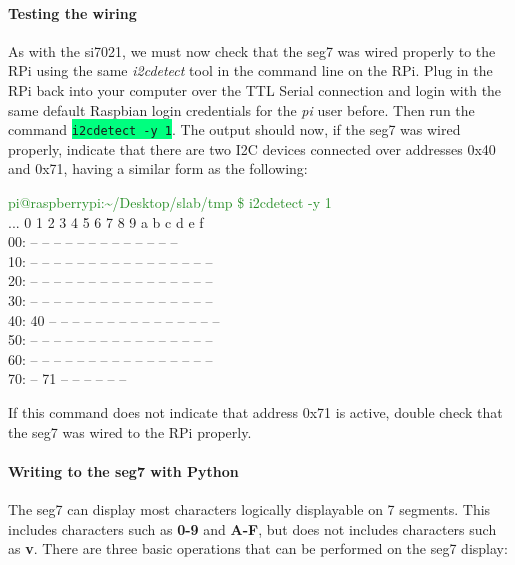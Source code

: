 \documentclass{article}
\newcommand*{\myfont}{\fontfamily{pcr}\selectfont}
\newcommand{\codei}[1]{\colorbox{SpringGreen}{\texttt{#1}}} %
\newcommand{\outputb}[2]{
  \begin{tcolorbox}[width=\textwidth,colback={light-gray},title={#1},colbacktitle=gray,coltitle=light-gray]
    \myfont
    #2
  \end{tcolorbox}
} %
\begin{document}
  \paragraph{Testing the wiring}
  As with the si7021, we must now check that the seg7 was wired properly to the RPi using the same \textit{i2cdetect} tool in the command line on the RPi. Plug in the RPi back into your computer over the TTL Serial connection and login with the same default Raspbian login credentials for the \textit{pi} user before. Then run the command \codei{i2cdetect -y 1}. The output should now, if the seg7 was wired properly, indicate that there are two I2C devices connected over addresses 0x40 and 0x71, having a similar form as the following:
  \outputb{I2C detection output (seg7 and si7021 both wired)}
 {
    \textcolor{ForestGreen}{pi@raspberrypi:\textasciitilde/Desktop/slab/tmp \$ i2cdetect -y 1} \\
    ...  0  1  2  3  4  5  6  7  8  9  a  b  c  d  e  f \\
    00:          -- -- -- -- -- -- -- -- -- -- -- -- -- \\
    10: -- -- -- -- -- -- -- -- -- -- -- -- -- -- -- -- \\
    20: -- -- -- -- -- -- -- -- -- -- -- -- -- -- -- -- \\
    30: -- -- -- -- -- -- -- -- -- -- -- -- -- -- -- -- \\
    40: 40 -- -- -- -- -- -- -- -- -- -- -- -- -- -- -- \\
    50: -- -- -- -- -- -- -- -- -- -- -- -- -- -- -- -- \\
    60: -- -- -- -- -- -- -- -- -- -- -- -- -- -- -- -- \\
    70: -- 71 -- -- -- -- -- --
  }
  If this command does not indicate that address 0x71 is active, double check that the seg7 was wired to the RPi properly.
  \paragraph{Writing to the seg7 with Python}
  The seg7 can display most characters logically displayable on 7 segments. This includes characters such as \textbf{0-9} and \textbf{A-F}, but does not includes characters such as \textbf{v}. There are three basic operations that can be performed on the seg7 display:
\end{document}
